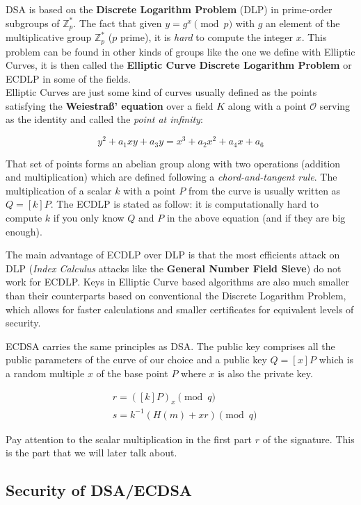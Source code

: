 \documentclass[a4paper,11pt]{article}
\begin{document}
DSA is based on the \textbf{Discrete Logarithm Problem} (DLP) in prime-order subgroups of $\mathbb{Z}^{\ast}_p$. The fact that given $y = g^x \pmod{p}$ with $g$ an element of the multiplicative group $\mathbb{Z}_{p}^{\ast}$ ($p$ prime), it is \emph{hard} to compute the integer $x$. This problem can be found in other kinds of groups like the one we define with Elliptic Curves, it is then called the \textbf{Elliptic Curve Discrete Logarithm Problem} or ECDLP in some of the fields.\\

Elliptic Curves are just some kind of curves usually defined as the points satisfying the \textbf{Weiestraß' equation} over a field $K$ along with a point $\mathcal{O}$ serving as the identity and called the \textit{point at infinity}:

$$ y^2 + a_1xy + a_3y = x^3 + a_2x^2 + a_4x + a_6 $$

That set of points forms an abelian group along with two operations (addition and multiplication) which are defined following a \textit{chord-and-tangent rule}. The multiplication of a scalar $k$ with a point $P$ from the curve is usually written as $Q = [k]P$. The ECDLP is stated as follow: it is computationally hard to compute $k$ if you only know $Q$ and $P$ in the above equation (and if they are big enough).

The main advantage of ECDLP over DLP is that the most efficients attack on DLP (\textit{Index Calculus} attacks like the \textbf{General Number Field Sieve}) do not work for ECDLP. Keys in Elliptic Curve based algorithms are also much smaller than their counterparts based on conventional the Discrete Logarithm Problem, which allows for faster calculations and smaller certificates for equivalent levels of security. 

ECDSA carries the same principles as DSA. The public key comprises all the public parameters of the curve of our choice and a public key $Q = [x]P$ which is a random multiple $x$ of the base point $P$  where $x$ is also the private key.

\begin{align*}
&r = ([k]P)_x \pmod{q}\\
&s = k^{-1} ( H(m) + x r ) \pmod{q}
\end{align*}

Pay attention to the scalar multiplication in the first part $r$ of the signature. This is the part that we will later talk about.

\subsection{Security of DSA/ECDSA}\label{security_dsa_ecdsa}
\end{document}
